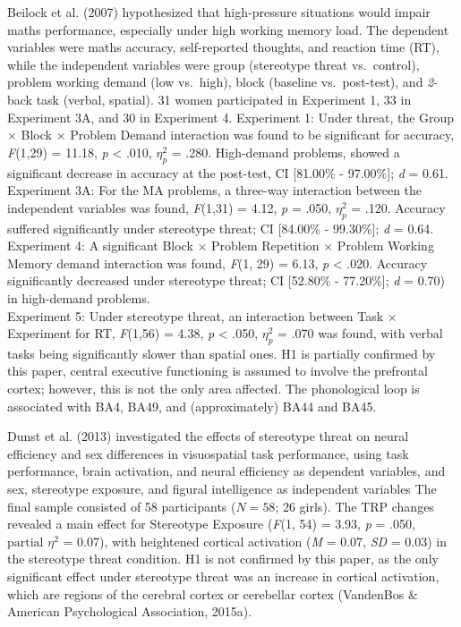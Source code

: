 \documentclass[
  stu, a4paper,floatsintext]{apa7}
\begin{document}
Beilock et al. (2007) hypothesized that high-pressure situations would impair maths performance, especially under high working memory load.
The dependent variables were maths accuracy, self-reported thoughts, and reaction time (RT), while the independent variables were group (stereotype threat vs.~control), problem working demand (low vs.~high), block (baseline vs.~post-test), and \emph{2}-back task (verbal, spatial).
31 women participated in Experiment 1, 33 in Experiment 3A, and 30 in Experiment 4.
Experiment 1: Under threat, the Group \(\times\) Block \(\times\) Problem Demand interaction was found to be significant for accuracy, \emph{F}(1,29) = 11.18, \emph{p} \textless{} .010, \(\eta^{2}_{p}\) = .280.
High-demand problems, showed a significant decrease in accuracy at the post-test, CI {[}81.00\% - 97.00\%{]}; \emph{d} = 0.61.\\
Experiment 3A: For the MA problems, a three-way interaction between the independent variables was found, \emph{F}(1,31) = 4.12, \emph{p} = .050, \(\eta^{2}_{p}\) = .120.
Accuracy suffered significantly under stereotype threat; CI {[}84.00\% - 99.30\%{]}; \emph{d} = 0.64.\\
Experiment 4: A significant Block \(\times\) Problem Repetition \(\times\) Problem Working Memory demand interaction was found, \emph{F}(1, 29) = 6.13, \emph{p} \textless{} .020.
Accuracy significantly decreased under stereotype threat; CI {[}52.80\% - 77.20\%{]}; \emph{d} = 0.70) in high-demand problems.\\
Experiment 5: Under stereotype threat, an interaction between Task \(\times\) Experiment for RT, \emph{F}(1,56) = 4.38, \emph{p} \textless{} .050, \(\eta^{2}_{p}\) = .070 was found, with verbal tasks being significantly slower than spatial ones.
H1 is partially confirmed by this paper, central executive functioning is assumed to involve the prefrontal cortex; however, this is not the only area affected.
The phonological loop is associated with BA4, BA49, and (approximately) BA44 and BA45.

Dunst et al. (2013) investigated the effects of stereotype threat on neural efficiency and sex differences in visuospatial task performance, using task performance, brain activation, and neural efficiency as dependent variables, and sex, stereotype exposure, and figural intelligence as independent variables
The final sample consisted of 58 participants (\(N = 58\); 26 girls).
The TRP changes revealed a main effect for Stereotype Exposure (\emph{F}(1, 54) = 3.93, \emph{p} = .050, \(\text{partial }\eta^{2}\) = 0.07), with heightened cortical activation (\emph{M} = 0.07, \emph{SD} = 0.03) in the stereotype threat condition.
H1 is not confirmed by this paper, as the only significant effect under stereotype threat was an increase in cortical activation, which are regions of the cerebral cortex or cerebellar cortex (VandenBos \& American Psychological Association, 2015a).
\end{document}
